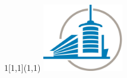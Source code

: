 \begin{titlepage}
\vspace*{.433cm}

\setlength{\TPHorizModule}{\paperwidth - (.5\paperwidth - .5\textwidth)}
\setlength{\TPVertModule}{\paperheight - (.5\paperheight - .5\textheight)}
\begin{textblock}{1}[1,1](1,1)
\includegraphics[width=100pt]{figures/logo-cropped}
\end{textblock}

\end{titlepage}

\cleardoublepage
{}
